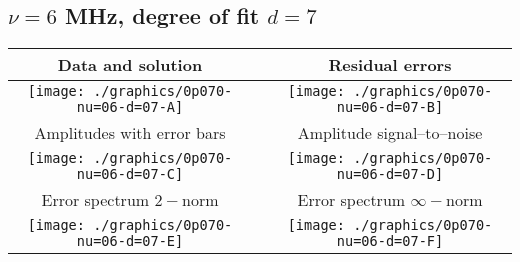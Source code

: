 

% 

\clearpage{}
\break{}

\subsection{$\nu = 6$ MHz, degree of fit $d = 7$}

\begin{table}[h]
    \begin{center}
        \begin{tabular}{ccc}
            Data and solution & \quad & Residual errors \\\hline
            \texttt{[image: ./graphics/0p070-nu=06-d=07-A]} &&
            \texttt{[image: ./graphics/0p070-nu=06-d=07-B]} \\[15pt]
            Amplitudes with error bars && Amplitude signal--to--noise \\\hline
            \texttt{[image: ./graphics/0p070-nu=06-d=07-C]} &&
            \texttt{[image: ./graphics/0p070-nu=06-d=07-D]} \\[15pt]
            Error spectrum $2-$norm && Error spectrum $\infty-$norm \\\hline
            \texttt{[image: ./graphics/0p070-nu=06-d=07-E]} &&
            \texttt{[image: ./graphics/0p070-nu=06-d=07-F]} \\[15pt]
        \end{tabular}
    \end{center}
\label{fig:elev=70, nu=6}
\end{table}



\endinput
